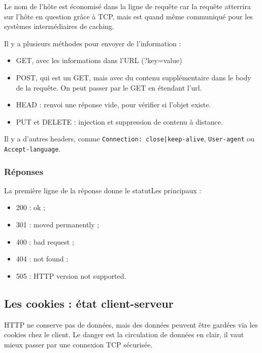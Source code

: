 		
		Le nom de l'hôte est économisé dans la ligne de requête car la requête atterrira sur l'hôte en question grâce à TCP, mais est quand même communiqué pour les systèmes intermédiaires de caching.
		
		Il y a plusieurs méthodes pour envoyer de l'information :
		
		\begin{itemize}
			\item GET, avec les informations dans l'URL (?key=value)
		
			\item POST, qui est un GET, mais avec du contenu supplémentaire dans le body de la requête. On peut passer par le GET en étendant l'url.
			
			\item HEAD : renvoi une réponse vide, pour vérifier si l'objet existe.
			
			\item PUT et DELETE : injection et suppression de contenu à distance.
		\end{itemize}
		
		Il y a d'autres headers, comme \texttt{Connection: close|keep-alive}, \texttt{User-agent} ou \texttt{Accept-language}.
		
		\subsubsection{Réponses}
		
		
		La première ligne de la réponse donne le statutLes principaux :
		
		\begin{itemize}
			\item 200 : ok ;
			\item 301 : moved permanently ;
			\item 400 : bad request ;
			\item 404 : not found ;
			\item 505 : HTTP version not supported.
		\end{itemize}
		
	\subsection{Les cookies : état client-serveur}
	
	HTTP ne conserve pas de données, mais des données peuvent être gardées via les cookies chez le client. Le danger est la circulation de données en clair, il vaut mieux passer par une connexion TCP sécurisée. 
	
